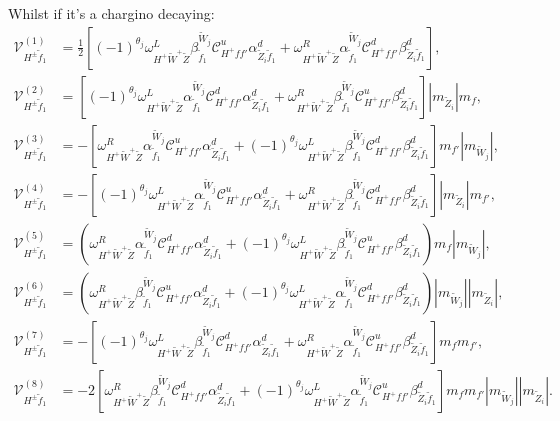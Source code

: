 \documentclass[final,3p,times]{elsarticle}
\begin{document}
Whilst if it's a chargino decaying:
\begin{align}
\mathcal{V}_{H^{\pm} \tilde{f}_1}^{(1)} &= \frac{1}{2}[(-1)^{\theta_j} \omega_{H^+ \tilde{W}^+ \tilde{Z}}^L \beta_{\tilde{f}_1}^{\tilde{W}_j} \mathcal{C}_{H^+ f f'}^u \alpha_{\tilde{Z}_i \tilde{f}_1}^{d} + \omega_{H^+ \tilde{W}^+ \tilde{Z}}^R \alpha_{\tilde{f}_1}^{\tilde{W}_j} \mathcal{C}_{H^+ f f'}^d \beta_{\tilde{Z}_i \tilde{f}_1}^{d}], \\
\mathcal{V}_{H^{\pm} \tilde{f}_1}^{(2)} &= [(-1)^{\theta_j}\omega_{H^+ \tilde{W}^+ \tilde{Z}}^L \alpha_{\tilde{f}_1}^{\tilde{W}_j} \mathcal{C}_{H^+ f f'}^d \alpha_{\tilde{Z}_i \tilde{f}_1}^{d} + \omega_{H^+ \tilde{W}^+ \tilde{Z}}^R \beta_{\tilde{f}_1}^{\tilde{W}_j} \mathcal{C}_{H^+ f f'}^u \beta_{\tilde{Z}_i \tilde{f}_1}^{d}]|m_{\tilde{Z}_i}|m_{f}, \\
\mathcal{V}_{H^{\pm} \tilde{f}_1}^{(3)} &= -[\omega_{H^+ \tilde{W}^+ \tilde{Z}}^R \alpha_{\tilde{f}_1}^{\tilde{W}_j} \mathcal{C}_{H^+ f f'}^u \alpha_{\tilde{Z}_i \tilde{f}_1}^{d} + (-1)^{\theta_j} \omega_{H^+ \tilde{W}^+ \tilde{Z}}^L \beta_{\tilde{f}_1}^{\tilde{W}_j} \mathcal{C}_{H^+ f f'}^d \beta_{\tilde{Z}_i \tilde{f}_1}^{d}]m_{f'}|m_{\tilde{W}_j}|, \\
\mathcal{V}_{H^{\pm} \tilde{f}_1}^{(4)} &= -[(-1)^{\theta_j} \omega_{H^+ \tilde{W}^+ \tilde{Z}}^L \alpha_{\tilde{f}_1}^{\tilde{W}_j} \mathcal{C}_{H^+ f f'}^u \alpha_{\tilde{Z}_i \tilde{f}_1}^{d} + \omega_{H^+ \tilde{W}^+ \tilde{Z}}^R \beta_{\tilde{f}_1}^{\tilde{W}_j} \mathcal{C}_{H^+ f f'}^d \beta_{\tilde{Z}_i \tilde{f}_1}^{d}]|m_{\tilde{Z}_i}|m_{f'}, \\
\mathcal{V}_{H^{\pm} \tilde{f}_1}^{(5)} &= (\omega_{H^+ \tilde{W}^+ \tilde{Z}}^R \alpha_{\tilde{f}_1}^{\tilde{W}_j} \mathcal{C}_{H^+ f f'}^d \alpha_{\tilde{Z}_i \tilde{f}_1}^{d} + (-1)^{\theta_j} \omega_{H^+ \tilde{W}^+ \tilde{Z}}^L  \beta_{\tilde{f}_1}^{\tilde{W}_j} \mathcal{C}_{H^+ f f'}^u \beta_{\tilde{Z}_i \tilde{f}_1}^{d})m_{f}|m_{\tilde{W}_j}|, \\
\mathcal{V}_{H^{\pm} \tilde{f}_1}^{(6)} &= (\omega_{H^+ \tilde{W}^+ \tilde{Z}}^R \beta_{\tilde{f}_1}^{\tilde{W}_j} \mathcal{C}_{H^+ f f'}^u \alpha_{\tilde{Z}_i \tilde{f}_1}^{d} + (-1)^{\theta_j} \omega_{H^+ \tilde{W}^+ \tilde{Z}}^L \alpha_{\tilde{f}_1}^{\tilde{W}_j} \mathcal{C}_{H^+ f f'}^d \beta_{\tilde{Z}_i \tilde{f}_1}^{d})|m_{\tilde{W}_j}||m_{\tilde{Z}_i}|, \\
\mathcal{V}_{H^{\pm} \tilde{f}_1}^{(7)} &= -[(-1)^{\theta_j} \omega_{H^+ \tilde{W}^+ \tilde{Z}}^L \beta_{\tilde{f}_1}^{\tilde{W}_j} \mathcal{C}_{H^+ f f'}^d \alpha_{\tilde{Z}_i \tilde{f}_1}^{d} + \omega_{H^+ \tilde{W}^+ \tilde{Z}}^R \alpha_{\tilde{f}_1}^{\tilde{W}_j} \mathcal{C}_{H^+ f f'}^u \beta_{\tilde{Z}_i \tilde{f}_1}^{d}]m_{f}m_{f'}, \\
\mathcal{V}_{H^{\pm} \tilde{f}_1}^{(8)} &= -2[\omega_{H^+ \tilde{W}^+ \tilde{Z}}^R \beta_{\tilde{f}_1}^{\tilde{W}_j} \mathcal{C}_{H^+ f f'}^d \alpha_{\tilde{Z}_i \tilde{f}_1}^{d} + (-1)^{\theta_j} \omega_{H^+ \tilde{W}^+ \tilde{Z}}^L \alpha_{\tilde{f}_1}^{\tilde{W}_j} \mathcal{C}_{H^+ f f'}^u \beta_{\tilde{Z}_i \tilde{f}_1}^{d}]m_{f}m_{f'}|m_{\tilde{W}_j}||m_{\tilde{Z}_i}|.
\end{align}
\end{document}
